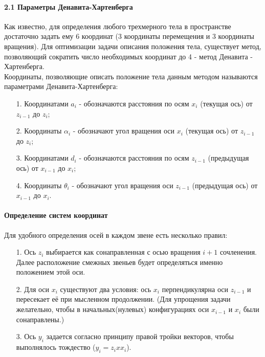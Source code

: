 \paragraph*{2.1 Параметры Денавита-Хартенберга\\}

\hspace*{\parindent}Как известно, для определения любого трехмерного тела в пространстве достаточно задать ему 6 координат (3 координаты перемещения и 3 координаты вращения). Для оптимизации задачи описания положения тела, существует метод, позволяющий сократить число необходимых координат до 4 - метод Денавита - Хартенберга.\\

\hspace*{\parindent}Координаты, позволяющие описать положение тела данным методом называются параметрами Денавита-Хартенберга:
\begin{enumerate} 
 \item[1.] Координатами $a_i$ - обозначаются расстояния по осям $x_i$ (текущая ось) от  $z_{i-1}$ до $z_i$;
 \item[2.] Координаты $\alpha_i$ - обозначают угол вращения оси $x_i$ (текущая ось) от  $z_{i-1}$ до $z_i$;
 \item[3.] Координатами $d_i$ - обозначаются расстояния по осям $z_{i-1}$ (предыдущая ось) от  $x_{i-1}$ до $x_i$;
 \item[4.] Координаты $\theta_i$ - обозначают угол вращения оси $z_{i-1}$ (предыдущая ось) от  $x_{i-1}$ до $x_i$.\\
 \end{enumerate}
 
 \paragraph*{Определение систем координат\\}
\hspace*{\parindent}Для удобного определения осей в каждом звене есть несколько правил:
\begin{enumerate} 
\item[1.] Ось $z_i$ выбирается как сонаправленная с осью вращения $i+1$ сочленения. Далее расположение смежных звеньев будет определяться именно положением этой оси.
\item[2.] Для оси $x_i$ существуют два условия: ось $x_i$ перпендикулярна оси $z_{i-1}$ и пересекает её при мысленном продолжении. (Для упрощения задачи желательно, чтобы в начальных(нулевых) конфигурациях оси $x_{i-1}$ и $x_i$ были сонаправлены.)
\item[3.] Ось $y_i$ задается согласно принципу правой тройки векторов, чтобы выполнялось тождество ($y_i = z_i x x_i$).
 \end{enumerate}

